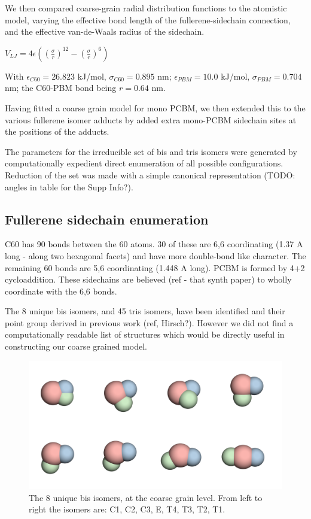 \documentclass[journal=nanofd,manuscript=suppinfo]{achemso}
\begin{document}
We then compared coarse-grain radial distribution functions to the atomistic model, varying the effective bond length of the fullerene-sidechain connection, and the effective van-de-Waals radius of the sidechain.

$ V_{LJ} = 4 \epsilon (\left ( \frac{\sigma}{r} \right )^{12} - \left(\frac{\sigma}{r}\right )^{6}) $

With $\epsilon_{C60}=26.823$ kJ/mol, $\sigma_{C60}=0.895$ nm; $\epsilon_{PBM}=10.0$ kJ/mol, $\sigma_{PBM}=0.704$ nm; the C60-PBM bond being $r=0.64$ nm.

Having fitted a coarse grain model for mono PCBM, we then extended this to the various fullerene isomer adducts by added extra mono-PCBM sidechain sites at the positions of the adducts.

The parameters for the irreducible set of bis and tris isomers were generated by computationally expedient direct enumeration of all possible configurations. Reduction of the set was made with a simple canonical representation (TODO: angles in table for the Supp Info?).

\subsection{Fullerene sidechain enumeration}

C60 has 90 bonds between the 60 atoms. 30 of these are 6,6 coordinating (1.37
A long - along two hexagonal facets) and have more double-bond like character.
The remaining 60 bonds are 5,6 coordinating (1.448 A long). PCBM is formed by
4+2 cycloaddition.
These sidechains are believed (ref - that synth paper) to
wholly coordinate with the 6,6 bonds.

The 8 unique bis isomers, and 45 tris isomers, have been identified and their
point group derived in previous work (ref, Hirsch?).
However we did not find a computationally readable list of structures which
would be directly useful in constructing our coarse grained model.

\begin{figure}[ht!]
    \begin{center}
        \includegraphics[width=\textwidth]{bis_white_bg_pastel.png}
            \caption{\label{fig-8bisCG}The 8 unique bis isomers, at the coarse grain level. From left to right the isomers are: C1, C2, C3, E, T4, T3, T2, T1.}
    \end{center}
\end{figure}
\end{document}
